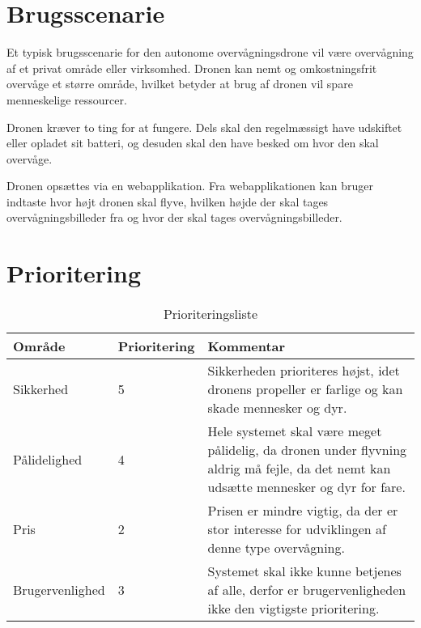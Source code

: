 \section{Brugsscenarie}

Et typisk brugsscenarie for den autonome overvågningsdrone vil være overvågning af et privat område eller virksomhed. Dronen kan nemt og omkostningsfrit overvåge et større område, hvilket betyder at brug af dronen vil spare menneskelige ressourcer. 

Dronen kræver to ting for at fungere. Dels skal den regelmæssigt have udskiftet eller opladet sit batteri, og desuden skal den have besked om hvor den skal overvåge.

Dronen opsættes via en webapplikation. Fra webapplikationen kan bruger indtaste hvor højt dronen skal flyve, hvilken højde der skal tages overvågningsbilleder fra og hvor der skal tages overvågningsbilleder.



\section{Prioritering}

\begin{table}[H]
	\centering
		\begin{tabular}{|l|l|p{7 cm}|} 
		\hline
			Område & Prioritering & Kommentar \\ \hline
			Sikkerhed 		& 5 	& Sikkerheden prioriteres højst, idet dronens propeller er farlige og kan skade mennesker og dyr.   \\ \hline
			
			Pålidelighed 	& 4 	& Hele systemet skal være meget pålidelig, da dronen under flyvning aldrig må fejle, da det nemt kan udsætte mennesker og dyr for fare.  \\ \hline
			
			Pris 			& 2 	& Prisen er mindre vigtig, da der er stor interesse for udviklingen af denne type overvågning.    \\ \hline
			
			Brugervenlighed & 3 	& Systemet skal ikke kunne betjenes af alle, derfor er brugervenligheden ikke den vigtigste prioritering. \\ \hline
		\end{tabular}
	\caption{Prioriteringsliste}
\end{table}
